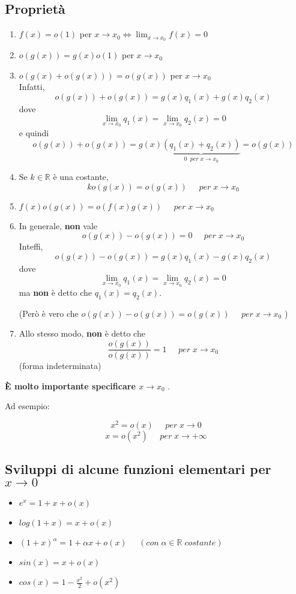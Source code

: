 \documentclass[a4paper]{article}
\theoremstyle{break}
\theoremstyle{break}
\theoremstyle{break}
\theoremstyle{break}
\begin{document}
\subsection{Proprietà}
\begin{enumerate}
	\item \( f(x) = o(1)\) per \( x \to x_0 \Leftrightarrow \lim_{x \to x_0} f(x) = 0  \)
	\item \( o(g(x)) = g(x) o(1) \) per \( x \to x_0 \)
	\item \( o(g(x) + o(g(x))) = o(g(x)) \) per \( x \to x_0 \) \\
	      Infatti,\[
		      o(g(x)) + o(g(x)) = g(x) q_1(x) + g(x) q_2(x)
	      \] dove
	      \[
		      \lim_{x \to x_0} q_1(x) = \lim_{x \to x_0} q_2(x) = 0
	      \] e quindi
	      \[
		      o(g(x)) + o(g(x)) = g(x) \underbrace{(q_1(x) + q_2(x))}_{0\;\; per\; x \to x_0} = o(g(x))
	      \]
	\item Se \( k \in \mathbb{R} \) è una costante,
	      \[
		      k o(g(x)) = o(g(x))\;\;\;\;\;per\;x \to x_0
	      \]
	\item \( f(x)o(g(x)) = o(f(x)g(x))\;\;\;\;\;per\; x \to x_0 \)
	\item In generale, \textbf{non} vale
	      \[
		      o(g(x)) - o(g(x)) = 0\;\;\;\;\;per\; x \to x_0
	      \]
	      Inteffi,
	      \[
		      o(g(x)) - o(g(x)) = g(x)q_1(x) - g(x)q_2(x)
	      \]
	      dove
	      \[
		      \lim_{x \to x_0} q_1(x) = \lim_{x \to x_0} q_2(x) = 0
	      \]
	      ma \textbf{non} è detto che \( q_1(x)=q_2(x) \).

	      (Però è vero che \( o(g(x))-o(g(x)) = o(g(x))\;\;\;\;\;per\; x \to x_0 \) )
	\item Allo stesso modo, \textbf{non} è detto che
	      \[
		      \frac{o(g(x))}{o(g(x))} = 1 \;\;\;\;\;per\; x \to x_0
	      \] (forma indeterminata)
\end{enumerate}
\textbf{È molto importante specificare \( x \to x_0 \) }.

Ad esempio:
\begin{example}
	\[
		x^2 = o(x) \;\;\;\;\;per\; x \to 0
	\]
	\[
		x = o(x^2) \;\;\;\;\;per\; x \to +\infty
	\]
\end{example}

\subsection{Sviluppi di alcune funzioni elementari per \( x \to 0 \) }
\begin{itemize}
	\item \(
	      e^x = 1 + x + o(x)
	      \)
	\item \(
	      log(1+x) = x + o(x)
	      \)
	\item \(
	      (1+x)^\alpha = 1 + \alpha x + o(x)\;\;\;\;\; (con\; \alpha \in \mathbb{R}\; costante)
	      \)
	\item \(
	      sin(x) = x + o(x)
	      \)
	\item \(
	      cos(x) = 1 - \frac{x^2}{2} + o(x^2)
	      \)
\end{itemize}
\end{document}
